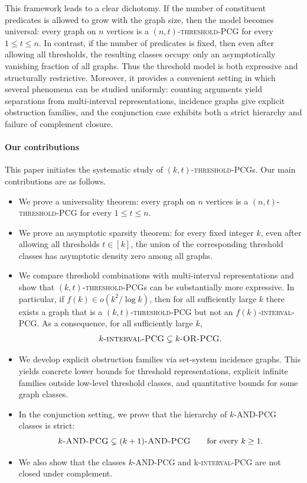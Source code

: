 \documentclass[a4paper,UKenglish,cleveref,autoref,thm-restate]{socg-lipics-v2021}
\begin{document}
This framework leads to a clear dichotomy. If the number of constituent predicates is
allowed to grow with the graph size, then the model becomes universal: every graph on
$n$ vertices is a \textsc{$(n,t)$-threshold-\textsc{PCG}} for every $1\le t\le n$. In contrast, if the number of predicates is fixed, then even after allowing all thresholds, the resulting classes occupy only an asymptotically vanishing fraction of all graphs. Thus the threshold model is both expressive and structurally restrictive. Moreover, it provides a convenient setting in which several phenomena can be studied uniformly: counting arguments yield separations from multi-interval representations, incidence graphs give explicit obstruction families, and the conjunction case exhibits both a strict hierarchy and failure of complement closure.

\paragraph*{Our contributions}
This paper initiates the systematic study of
\textsc{$(k,t)$-threshold-\textsc{PCG}}s. Our main contributions are as follows.
\begin{itemize}
    \item We prove a universality theorem: every graph on $n$ vertices is a
    \textsc{$(n,t)$-threshold-\textsc{PCG}} for every $1\le t\le n$.

    \item We prove an asymptotic sparsity theorem: for every fixed integer $k$, even
    after allowing all thresholds $t\in[k]$, the union of the corresponding threshold
    classes has asymptotic density zero among all graphs.

    \item We compare threshold combinations with multi-interval representations and show
    that \textsc{$(k,t)$-threshold-\textsc{PCG}}s can be substantially more expressive.
    In particular, if \(f(k)\in o(k^2/\log k)\), then for all sufficiently large \(k\)
    there exists a graph that is a \textsc{$(k,t)$-threshold-\textsc{PCG}} but not an
    \textsc{$f(k)$-interval-\textsc{PCG}}. As a consequence, for all sufficiently large
    \(k\),
    \[
    k\textsc{-interval-\textsc{PCG}} \subsetneq k\textsc{-OR-\textsc{PCG}}.
    \]

    \item We develop explicit obstruction families via set-system incidence graphs. This
    yields concrete lower bounds for threshold representations, explicit infinite
    families outside low-level threshold classes, and quantitative bounds for some graph classes.

    \item In the conjunction setting, we prove that the hierarchy of
    \textsc{$k$-\textsc{AND}-\textsc{PCG}} classes is strict:
    \[
    k\textsc{-AND-\textsc{PCG}} \subsetneq (k+1)\textsc{-AND-\textsc{PCG}}
    \qquad\text{for every }k\ge 1.
    \]

    \item We also show that the classes \(k\)-\textsc{AND}-\textsc{PCG} and k\textsc{-interval-\textsc{PCG}} are not closed under complement.
    
\end{itemize}
\end{document}
